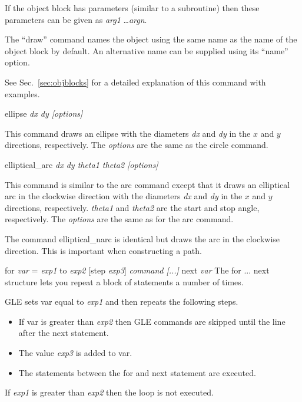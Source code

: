 \begin{commanddescription}
If the object block has parameters (similar to a subroutine) then these parameters can be given as {\it arg1} \ldots {\it argn}.

The ``draw'' command names the object using the same name as the name of the object block by default. An alternative name can be supplied using its ``name'' option.

See Sec.~\ref{sec:objblocks} for a detailed explanation of this command with examples.

\item[{\sf ellipse} {\it dx dy [options]}]

This command draws an ellipse with the diameters {\it dx} and {\it dy} in the $x$ and $y$ directions, respectively.  The {\it options} are the same as the {\sf circle} command.

\item[{\sf elliptical\_arc} {\it dx dy theta1 theta2 [options]}]

This command is similar to the {\sf arc} command except that it draws an elliptical arc in the clockwise direction with the diameters  {\it dx} and  {\it dy} in the $x$ and $y$ directions, respectively. {\it theta1} and {\it theta2} are the start and stop angle, respectively.  The {\it options} are the same as for the {\sf arc} command.

The command {\sf elliptical\_narc} is identical but draws the arc in the clockwise direction.  This is important when constructing a path.

\item[{\sf for {\it var} = {\it exp1} to {\it exp2} [step {\it exp3}] {\it command [...]} next {\it var}}  ]
  
The {\sf for ... next} structure lets you repeat a block of statements
a number of times.

GLE sets {\sf var} equal to {\it exp1} and then repeats the following
steps.

\begin{itemize}
\item If {\sf var} is greater than {\it exp2} then GLE commands are skipped
until the line after the {\sf next} statement.
\item The value {\it exp3} is added to {\sf var}.
\item The statements between the {\sf for} and {\sf next} statement are executed.
\end{itemize}

If {\it exp1} is greater than {\it exp2} then the loop is not executed.


\end{commanddescription}
